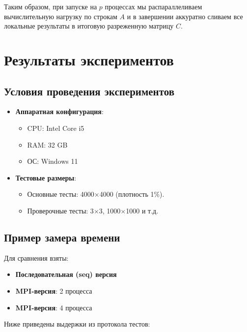 \documentclass[12pt]{article}
\begin{document}
Таким образом, при запуске на \(p\) процессах мы распараллеливаем вычислительную нагрузку по строкам \(A\) и в завершении аккуратно сливаем все локальные результаты в итоговую разреженную матрицу \(C\). 



\section{Результаты экспериментов}

\subsection{Условия проведения экспериментов}

\begin{itemize}
    \item \textbf{Аппаратная конфигурация}: 
    \begin{itemize}
        \item CPU: Intel Core i5
        \item RAM: 32 GB
        \item ОС: Windows 11
    \end{itemize}
    \item \textbf{Тестовые размеры}: 
    \begin{itemize}
        \item Основные тесты: 4000$\times$4000 (плотность 1\%).
        \item Проверочные тесты: 3$\times$3, 1000$\times$1000 и т.д.
    \end{itemize}
\end{itemize}

\subsection{Пример замера времени}
Для сравнения взяты:
\begin{itemize}
    \item \textbf{Последовательная (seq) версия}
    \item \textbf{MPI-версия}: 2 процесса
    \item \textbf{MPI-версия}: 4 процесса
\end{itemize}

Ниже приведены выдержки из протокола тестов:
\end{document}
